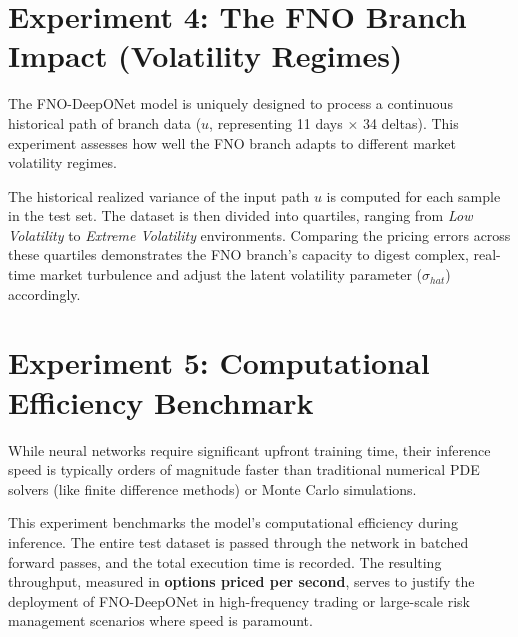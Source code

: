 \documentclass[11pt]{article}
\begin{document}
\section{Experiment 4: The FNO Branch Impact (Volatility Regimes)}
The FNO-DeepONet model is uniquely designed to process a continuous historical path of branch data ($u$, representing 11 days $\times$ 34 deltas). This experiment assesses how well the FNO branch adapts to different market volatility regimes.

The historical realized variance of the input path $u$ is computed for each sample in the test set. The dataset is then divided into quartiles, ranging from \textit{Low Volatility} to \textit{Extreme Volatility} environments. Comparing the pricing errors across these quartiles demonstrates the FNO branch's capacity to digest complex, real-time market turbulence and adjust the latent volatility parameter ($\sigma_{hat}$) accordingly.

\section{Experiment 5: Computational Efficiency Benchmark}
While neural networks require significant upfront training time, their inference speed is typically orders of magnitude faster than traditional numerical PDE solvers (like finite difference methods) or Monte Carlo simulations. 

This experiment benchmarks the model's computational efficiency during inference. The entire test dataset is passed through the network in batched forward passes, and the total execution time is recorded. The resulting throughput, measured in \textbf{options priced per second}, serves to justify the deployment of FNO-DeepONet in high-frequency trading or large-scale risk management scenarios where speed is paramount.
\end{document}
